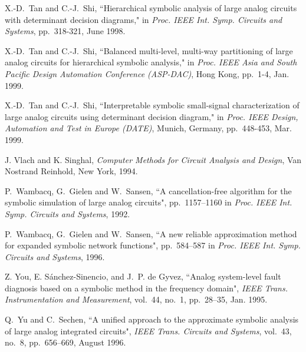 \begin{thebibliography}{99}
X.-D.~Tan and C.-J.~Shi,
``Hierarchical symbolic analysis of large analog circuits
with determinant decision diagrams,"
in {\it Proc. IEEE Int. Symp. Circuits and Systems}, pp.~318-321,
June 1998.

X.-D.~Tan and C.-J.~Shi,
``Balanced multi-level, multi-way
partitioning of large analog circuits for hierarchical symbolic analysis,"
in {\it Proc. IEEE Asia and South Pacific Design Automation Conference
(ASP-DAC)}, Hong Kong, pp.~1-4, Jan. 1999.

X.-D.~Tan and C.-J.~Shi, 
``Interpretable symbolic small-signal characterization of large analog
 circuits using determinant decision diagram," 
 in {\it Proc. IEEE Design, Automation and Test in Europe (DATE)}, 
 Munich, Germany, pp.~448-453, Mar. 1999. 

J. Vlach and K. Singhal,
{\it Computer Methods for Circuit Analysis and
Design}, Van Nostrand Reinhold, New York, 1994.

P.~Wambacq, G.~Gielen and W.~Sansen,
``A cancellation-free algorithm for the symbolic simulation
of large analog circuits",
pp.~1157--1160 in {\it Proc. IEEE Int. Symp. Circuits and Systems}, 1992.

P.~Wambacq, G.~Gielen and W.~Sansen,
``A new reliable approximation
method for expanded symbolic network
functions",
pp.~584--587 in {\it Proc. IEEE Int. Symp. Circuits and Systems}, 1996.

Z. You, E. S\'anchez-Sinencio,
and J.~P. de Gyvez,
``Analog system-level fault diagnosis based
on a symbolic method in the frequency domain",
{\it IEEE Trans. Instrumentation and Measurement},
vol.~44, no.~1, pp.~28--35, Jan. 1995.

Q.~Yu and C.~Sechen,
``A unified approach to the approximate symbolic analysis of 
large analog integrated circuits",
{\it IEEE Trans. Circuits and Systems}, vol.~43, no.~8,
pp.~656--669, August 1996.

\end{thebibliography}
 

